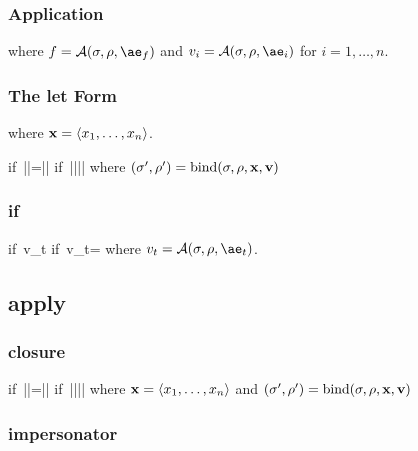 \begin{figure*}
\subsubsection{Application}

\noindent
{}
where $f=\A{\sigma}{\rho}{\ae_f}$ and $v_i=\A{\sigma}{\rho}{\ae_i}$ for $i=1,\dots,n$.

\subsubsection{The let Form}

\noindent
{}
where $\mathbf{x}=\langle x_1,\dots,x_n\rangle$.


       {}{\mbox{if }|\vx|=|\vv|}
       {\serr{\ks}{\sigma}{\noblame}}{\mbox{if }|\vx|\ne|\vv|}
where $(\sigma',\rho')=\mathrm{bind}(\sigma,\rho,\mathbf{x},\mathbf{v})$     

\subsubsection{if}

       {}{\mbox{if }v_t\ne\false}
       {}{\mbox{if }v_t=\false}
where $v_t=\A{\sigma}{\rho}{\ae_t}$.

\subsection{apply}

\subsubsection{closure}

       {}{\mbox{if }|\vx|=|\vv|}
       {\serr{\ks}{\sigma}{\blame{\ell}}}{\mbox{if }|\vx|\ne|\vv|}
where $\mathbf{x}=\langle x_1,\dots,x_n\rangle$ and $(\sigma',\rho')=\mathrm{bind}(\sigma,\rho,\mathbf{x},\mathbf{v})$

\subsubsection{impersonator}


\end{figure*}

